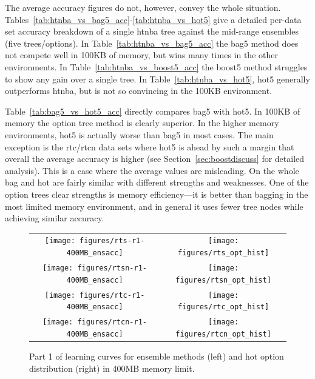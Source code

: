 The average accuracy figures do not, however, convey the whole situation. Tables~\ref{tab:htnba_vs_bag5_acc}-\ref{tab:htnba_vs_hot5} give a detailed per-data set accuracy breakdown of a single {\sc htnba} tree against the mid-range ensembles (five trees/options). In Table~\ref{tab:htnba_vs_bag5_acc} the {\sc bag5} method does not compete well in 100KB of memory, but wins many times in the other environments. In Table~\ref{tab:htnba_vs_boost5_acc} the {\sc boost5} method struggles to show any gain over a single tree. In Table~\ref{tab:htnba_vs_hot5}, {\sc hot5} generally outperforms {\sc htnba}, but is not so convincing in the 100KB environment.

Table~\ref{tab:bag5_vs_hot5_acc} directly compares {\sc bag5} with {\sc hot5}. In 100KB of memory the option tree method is clearly superior. In the higher memory environments, {\sc hot5} is actually worse than {\sc bag5} in most cases. The main exception is the {\sc rtc}/{\sc rtcn} data sets where {\sc hot5} is ahead by such a margin that overall the average accuracy is higher (see Section~\ref{sec:boostdiscuss} for detailed analysis). This is a case where the average values are misleading. On the whole {\sc bag} and {\sc hot} are fairly similar with different strengths and weaknesses. One of the option trees clear strengths is memory efficiency---it is better than bagging in the most limited memory environment, and in general it uses fewer tree nodes while achieving similar accuracy.

\begin{figure}
\centering
\begin{tabular}{c@{}c}
\texttt{[image: figures/rts-r1-400MB\_ensacc]} &
\texttt{[image: figures/rts\_opt\_hist]} \\
\texttt{[image: figures/rtsn-r1-400MB\_ensacc]} &
\texttt{[image: figures/rtsn\_opt\_hist]} \\
\texttt{[image: figures/rtc-r1-400MB\_ensacc]} &
\texttt{[image: figures/rtc\_opt\_hist]} \\
\texttt{[image: figures/rtcn-r1-400MB\_ensacc]} &
\texttt{[image: figures/rtcn\_opt\_hist]} \\
\end{tabular}
\caption{Part 1 of learning curves for ensemble methods (left) and {\sc hot} option distribution (right) in 400MB memory limit.}
\label{fig:400MB_ens1}
\end{figure}

